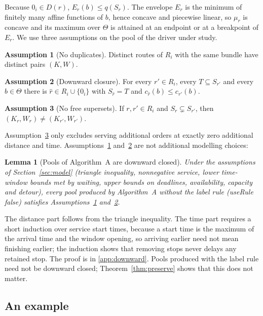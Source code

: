 \documentclass[review,12pt]{elsarticle}
\newtheorem{lemma}[theorem]{Lemma}
\theoremstyle{definition}
\newtheorem{assumption}{Assumption}
\theoremstyle{remark}
\begin{document}
Because $0_i\in D(r)$, $E_r(b)\le q(S_r)$. The envelope $E_r$ is the
minimum of finitely many affine functions of $b$, hence concave and
piecewise linear, so $\mu_r$ is concave and its maximum over $\Theta$ is
attained at an endpoint or at a breakpoint of $E_r$. We use three
assumptions on the pool of the driver under study.

\begin{assumption}[No duplicates]\label{ass:nodup}
Distinct routes of $R_i$ with the same bundle have distinct pairs $(K,W)$.
\end{assumption}
\begin{assumption}[Downward closure]\label{ass:down}
For every $r'\in R_i$, every $T\subseteq S_{r'}$ and every $b\in\Theta$
there is $\hat r\in R_i\cup\{0_i\}$ with $S_{\hat r}=T$ and
$c_{\hat r}(b)\le c_{r'}(b)$.
\end{assumption}
\begin{assumption}[No free supersets]\label{ass:nofree}
If $r,r'\in R_i$ and $S_r\subsetneq S_{r'}$, then
$(K_r,W_r)\ne(K_{r'},W_{r'})$.
\end{assumption}

Assumption~\ref{ass:nofree} only excludes serving additional orders at
exactly zero additional distance and time. Assumptions~\ref{ass:nodup}
and~\ref{ass:down} are not additional modelling choices:

\begin{lemma}[Pools of Algorithm~A are downward closed]
\label{lem:downward}
Under the assumptions of Section~\ref{sec:model} (triangle inequality,
nonnegative service, lower time-window bounds met by waiting, upper bounds
on deadlines, availability, capacity and detour), every pool produced by
Algorithm~A without the label rule (\textit{useRule} false) satisfies
Assumptions~\ref{ass:nodup} and~\ref{ass:down}.
\end{lemma}

The distance part follows from the triangle inequality. The time part
requires a short induction over service start times, because a start time
is the maximum of the arrival time and the window opening, so arriving
earlier need not mean finishing earlier; the induction shows that removing
stops never delays any retained stop. The proof is in
\ref{app:downward}. Pools produced with the label rule need not be
downward closed; Theorem~\ref{thm:preserve} shows that this does not matter.

\subsection{An example}
\end{document}
